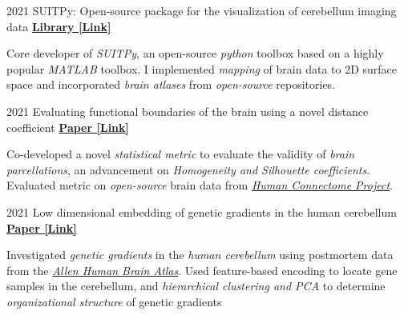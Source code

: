 

\begin{cventries}
    
  \cventry
    {2021} %
  	{SUITPy: Open-source package for the visualization of cerebellum imaging data} %
  	{\href{https://suitpy.readthedocs.io/en/latest/}{\textbf{Library [Link]}}}
  	{}
    {
      \begin{cvitems} %
      	\item {Core developer of \textit{SUITPy}, an open-source \textit{python} toolbox based on a highly popular \textit{MATLAB} toolbox. I implemented \textit{mapping} of brain data to 2D surface space and incorporated \textit{brain atlases} from \textit{open-source} repositories.}
      \end{cvitems}
    }
    
  \cventry
    {2021} %
    {Evaluating functional boundaries of the brain using a novel distance coefficient} %
    {\href{https://www.biorxiv.org/content/10.1101/2021.05.11.443151v1.full.pdf}{\textbf{Paper [Link]}}}
    {}
    {
      \begin{cvitems} %
        \item {Co-developed a novel \textit{statistical metric} to evaluate the validity of \textit{brain parcellations}, an advancement on \textit{Homogeneity and Silhouette coefficients}. Evaluated metric on \textit{open-source} brain data from \href{http://www.humanconnectomeproject.org/}{\textit{Human Connectome Project}}.}
      \end{cvitems}
    }
    
  \cventry
    {2021} %
    {Low dimensional embedding of genetic gradients in the human cerebellum} %
    {\href{https://papers.ssrn.com/sol3/papers.cfm?abstract_id=3797269}{\textbf{Paper [Link]}}}
    {}
    {
      \begin{cvitems} %
      	\item {Investigated \textit{genetic gradients} in the \textit{human cerebellum} using postmortem data from the \href{https://human.brain-map.org/}{\textit{Allen Human Brain Atlas}}. Used feature-based encoding to locate gene samples in the cerebellum, and \textit{hierarchical clustering and PCA} to determine \textit{organizational structure} of genetic gradients}
      \end{cvitems}
    }
    

\end{cventries}
